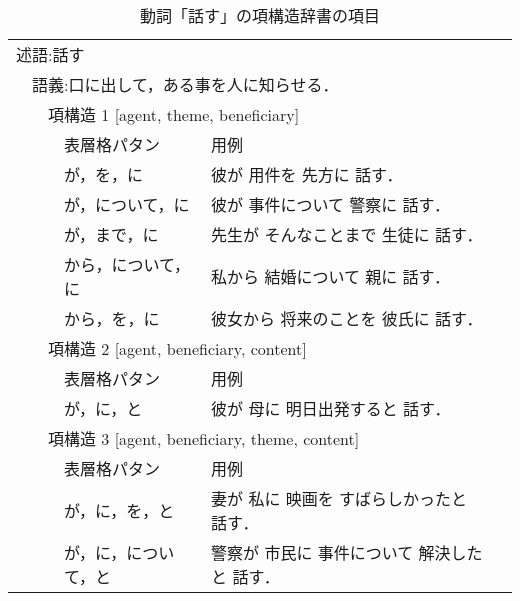 \begin{table}[tbp]
\begin{center}
\caption{動詞「話す」の項構造辞書の項目}
\small
\begin{tabular}{||llll|ll||} \hline\hline
\multicolumn{5}{||l}{述語:話す} &  \\
\multicolumn{1}{||l}{} & \multicolumn{4}{l}{語義:口に出して，ある事を人に知らせる．} &  \\
\multicolumn{1}{||l}{} & \multicolumn{1}{l}{} & \multicolumn{3}{l}{項構造 1 [agent, theme, beneficiary]} &  \\
\multicolumn{1}{||l}{} & \multicolumn{1}{l}{} &  & 表層格パタン & 用例 &  \\\cline{4-5}
\multicolumn{1}{||l}{} & \multicolumn{1}{l}{} & \multicolumn{1}{l}{} & が，を，に & 彼が 用件を 先方に 話す． &  \\
\multicolumn{1}{||l}{} & \multicolumn{1}{l}{} & \multicolumn{1}{l}{} & が，について，に & 彼が 事件について 警察に 話す． &  \\
\multicolumn{1}{||l}{} & \multicolumn{1}{l}{} & \multicolumn{1}{l}{} & が，まで，に & 先生が そんなことまで 生徒に 話す． &  \\
\multicolumn{1}{||l}{} & \multicolumn{1}{l}{} & \multicolumn{1}{l}{} & から，について，に & 私から 結婚について 親に 話す． &  \\
\multicolumn{1}{||l}{} & \multicolumn{1}{l}{} & \multicolumn{1}{l}{} & から，を，に & 彼女から 将来のことを 彼氏に 話す． &  \\
\multicolumn{1}{||l}{} & \multicolumn{1}{l}{} & \multicolumn{3}{l}{項構造 2 [agent, beneficiary, content]} &  \\
\multicolumn{1}{||l}{} & \multicolumn{1}{l}{} &  & 表層格パタン & 用例 &  \\\cline{4-5}
\multicolumn{1}{||l}{} & \multicolumn{1}{l}{} &  & が，に，と & 彼が 母に 明日出発すると 話す． &  \\
\multicolumn{1}{||l}{} & \multicolumn{1}{l}{} & \multicolumn{3}{l}{項構造 3 [agent, beneficiary, theme,  content]} &  \\
\multicolumn{1}{||l}{} & \multicolumn{1}{l}{} &  & 表層格パタン & 用例 &  \\\cline{4-5}
\multicolumn{1}{||l}{} & \multicolumn{1}{l}{} & \multicolumn{1}{l}{} & が，に，を，と & 妻が 私に 映画を すばらしかったと 話す． &  \\
\multicolumn{1}{||l}{} & \multicolumn{1}{l}{} & \multicolumn{1}{l}{} & が，に，について，と & 警察が 市民に 事件について 解決したと 話す． &  \\

\end{tabular}
\end{center}
\end{table}

